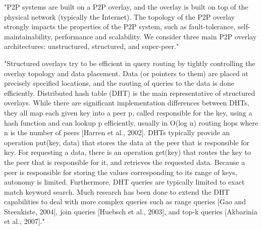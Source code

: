 "P2P systems are built on a P2P overlay, and the overlay is built on top of the physical network (typically the Internet).
The topology of the P2P overlay strongly impacts the properties of the P2P system, such as fault-tolerance, self-maintainability, performance and scalability.
We consider three main P2P overlay architectures: unstructured, structured, and super-peer."\cite{book:p2p-mob}

"Structured overlays try to be efficient in query routing by tightly controlling the overlay topology and data placement.
Data (or pointers to them) are placed at precisely specified locations, and the routing of queries to the data is done efficiently.
Distributed hash table (DHT) is the main representative of structured overlays.
While there are significant implementation differences between DHTs, they all map each given key into a peer p, called responsible for the key, using a hash function and can lookup p efficiently, usually in O(log n) routing hops where n is the number of peers [Harren et al., 2002].
DHTs typically provide an operation put(key, data) that stores the data at the peer that is responsible for key.
For requesting a data, there is an operation get(key) that routes the key to the peer that is responsible for it, and retrieves the requested data.
Because a peer is responsible for storing the values corresponding to its range of keys, autonomy is limited.
Furthermore, DHT queries are typically limited to exact match keyword search.
Much research has been done to extend the DHT capabilities to deal with more complex queries such as range queries [Gao and Steenkiste, 2004], join queries [Huebsch et al., 2003], and top-k queries [Akbarinia et al., 2007]."\cite{book:p2p-mob}

